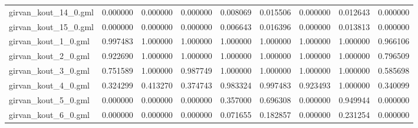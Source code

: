 \begin{tabular}{lrrrrrrrr}
girvan\_kout\_14\_0.gml       &                            0.000000 &                       0.000000 &                          0.000000 &                      0.008069 &                        0.015506 &                     0.000000 &                            0.012643 &                                0.000000 \\
girvan\_kout\_15\_0.gml       &                            0.000000 &                       0.000000 &                          0.000000 &                      0.006643 &                        0.016396 &                     0.000000 &                            0.013813 &                                0.000000 \\
girvan\_kout\_1\_0.gml        &                            0.997483 &                       1.000000 &                          1.000000 &                      1.000000 &                        1.000000 &                     1.000000 &                            1.000000 &                                0.966106 \\
girvan\_kout\_2\_0.gml        &                            0.922690 &                       1.000000 &                          1.000000 &                      1.000000 &                        1.000000 &                     1.000000 &                            1.000000 &                                0.796509 \\
girvan\_kout\_3\_0.gml        &                            0.751589 &                       1.000000 &                          0.987749 &                      1.000000 &                        1.000000 &                     1.000000 &                            1.000000 &                                0.585698 \\
girvan\_kout\_4\_0.gml        &                            0.324299 &                       0.413270 &                          0.374743 &                      0.983324 &                        0.997483 &                     0.923493 &                            1.000000 &                                0.340099 \\
girvan\_kout\_5\_0.gml        &                            0.000000 &                       0.000000 &                          0.000000 &                      0.357000 &                        0.696308 &                     0.000000 &                            0.949944 &                                0.000000 \\
girvan\_kout\_6\_0.gml        &                            0.000000 &                       0.000000 &                          0.000000 &                      0.071655 &                        0.182857 &                     0.000000 &                            0.231254 &                                0.000000 \\

\end{tabular}
